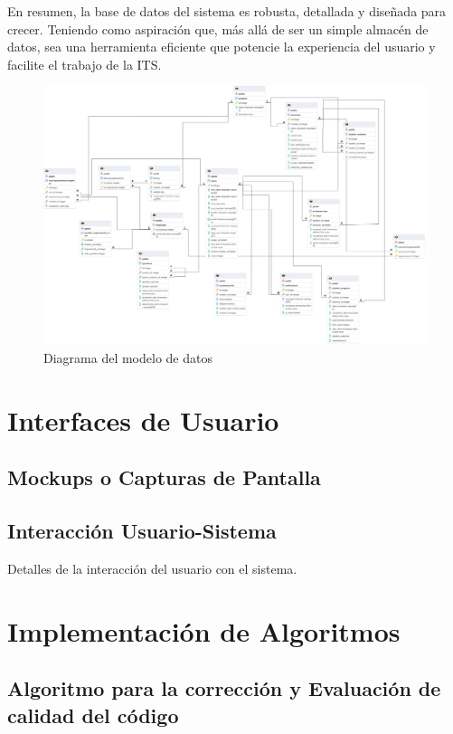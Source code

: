 En resumen, la base de datos del sistema es robusta, detallada y diseñada para crecer. Teniendo como aspiración que, más allá de ser un simple almacén de datos, sea una herramienta eficiente que potencie la experiencia del usuario y facilite el trabajo de la ITS.

\newpage

\begin{figure}[H]
    \centering
    \begin{sideways}
        \includegraphics[width=1.8\textwidth]{imagenes/er.png}
    \end{sideways}
    \caption{Diagrama del modelo de datos}
    \label{fig:modeladodedatos}
\end{figure}

\section{Interfaces de Usuario}
\subsection{Mockups o Capturas de Pantalla}
\subsection{Interacción Usuario-Sistema}
Detalles de la interacción del usuario con el sistema.

\section{Implementación de Algoritmos}
\subsection{Algoritmo para la corrección y Evaluación de calidad del código}

